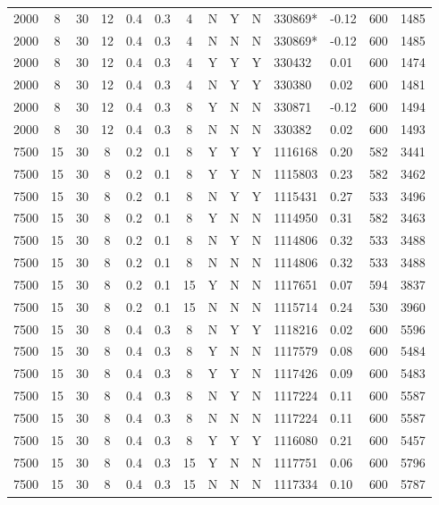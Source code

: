 \documentclass[a4paper, twocolumn, oneside, 10pt]{article}
\begin{document}
\begin{longtable}{|ccccccccccllll|}
	2000 & 8 & 30 & 12 & 0.4 & 0.3 & 4 & N & Y & N & 330869* & -0.12 & 600 & 1485\\
	2000 & 8 & 30 & 12 & 0.4 & 0.3 & 4 & N & N & N & 330869* & -0.12 & 600 & 1485\\
	2000 & 8 & 30 & 12 & 0.4 & 0.3 & 4 & Y & Y & Y & 330432 & 0.01 & 600 & 1474\\
	2000 & 8 & 30 & 12 & 0.4 & 0.3 & 4 & N & Y & Y & 330380 & 0.02 & 600 & 1481\\
	2000 & 8 & 30 & 12 & 0.4 & 0.3 & 8 & Y & N & N & 330871 & -0.12 & 600 & 1494\\
	2000 & 8 & 30 & 12 & 0.4 & 0.3 & 8 & N & N & N & 330382 & 0.02 & 600 & 1493\\
	7500 & 15 & 30 & 8 & 0.2 & 0.1 & 8 & Y & Y & Y & 1116168 & 0.20 & 582 & 3441\\
	7500 & 15 & 30 & 8 & 0.2 & 0.1 & 8 & Y & Y & N & 1115803 & 0.23 & 582 & 3462\\
	7500 & 15 & 30 & 8 & 0.2 & 0.1 & 8 & N & Y & Y & 1115431 & 0.27 & 533 & 3496\\
	7500 & 15 & 30 & 8 & 0.2 & 0.1 & 8 & Y & N & N & 1114950 & 0.31 & 582 & 3463\\
	7500 & 15 & 30 & 8 & 0.2 & 0.1 & 8 & N & Y & N & 1114806 & 0.32 & 533 & 3488\\
	7500 & 15 & 30 & 8 & 0.2 & 0.1 & 8 & N & N & N & 1114806 & 0.32 & 533 & 3488\\
	7500 & 15 & 30 & 8 & 0.2 & 0.1 & 15 & Y & N & N & 1117651 & 0.07 & 594 & 3837\\
	7500 & 15 & 30 & 8 & 0.2 & 0.1 & 15 & N & N & N & 1115714 & 0.24 & 530 & 3960\\
	7500 & 15 & 30 & 8 & 0.4 & 0.3 & 8 & N & Y & Y & 1118216 & 0.02 & 600 & 5596\\
	7500 & 15 & 30 & 8 & 0.4 & 0.3 & 8 & Y & N & N & 1117579 & 0.08 & 600 & 5484\\
	7500 & 15 & 30 & 8 & 0.4 & 0.3 & 8 & Y & Y & N & 1117426 & 0.09 & 600 & 5483\\
	7500 & 15 & 30 & 8 & 0.4 & 0.3 & 8 & N & Y & N & 1117224 & 0.11 & 600 & 5587\\
	7500 & 15 & 30 & 8 & 0.4 & 0.3 & 8 & N & N & N & 1117224 & 0.11 & 600 & 5587\\
	7500 & 15 & 30 & 8 & 0.4 & 0.3 & 8 & Y & Y & Y & 1116080 & 0.21 & 600 & 5457\\
	7500 & 15 & 30 & 8 & 0.4 & 0.3 & 15 & Y & N & N & 1117751 & 0.06 & 600 & 5796\\
	7500 & 15 & 30 & 8 & 0.4 & 0.3 & 15 & N & N & N & 1117334 & 0.10 & 600 & 5787\\

\end{longtable}
\end{document}

